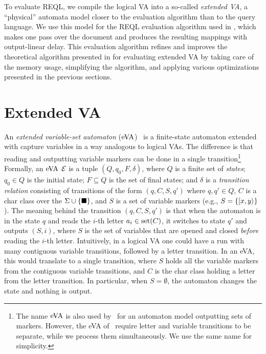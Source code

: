 
To evaluate REQL, we compile the logical VA into a so-called \emph{extended VA},
a ``physical'' automata model closer to the evaluation algorithm than to the
query language. We use this model for the REQL evaluation algorithm used in
\rematch, which makes one pass over the document and produces the resulting
mappings with output-linear delay. This evaluation algorithm refines and
improves the theoretical algorithm presented in \citet{FlorenzanoRUVV20} for
evaluating extended VA by taking care of the memory usage, simplifying the
algorithm, and applying various optimizations presented in the previous
sections.

\section{Extended VA}

An \emph{extended variable-set automaton} (\(\mathrm{eVA}\))~\citep{FaginKRV15} is a
finite-state automaton extended with capture variables in a way analogous to
logical VAs. The difference is that reading and outputting variable markers can
be done in a single transition\footnote{The name $\mathrm{eVA}$ is also used
by~\citet{FlorenzanoRUVV20} for an automaton model outputting sets of markers.
However, the eVA of~\citet{FlorenzanoRUVV20} require letter and variable
transitions to be separate, while we process them simultaneously. We use the
same name for simplicity.}
Formally, an $\mathrm{eVA}$ $\mathcal{E}$ is a tuple \((Q, q_0, F, \delta)\), where \(Q\) is a
finite set of \textit{states}; $q_0 \in Q$ is the initial state; $F\subseteq Q$
is the set of final states; and $\delta$ is a \textit{transition relation}
consisting of transitions of the form $(q, C, S, q')$ where $q, q' \in Q$, $C$
is a char class over the $\Sigma \cup \{\blacksquare\}$, and $S$ is a set of
variable markers (e.g., $S=\{[ x,y \rangle\}$). The meaning behind the
transition $(q, C, S, q')$ is that when the automaton is in the state $q$ and
reads the $i$-th letter $a_i \in \operatorname{set}(C)$, it switches to state $q'$ and
outputs $(S, i)$, where $S$ is the set of variables that are opened and closed
\emph{before} reading the $i$-th letter. Intuitively, in a logical VA one could
have a run with many contiguous variable transitions, followed by a letter
transition. In an eVA, this would translate to a single transition, where $S$
holds all the variable markers from the contiguous variable transitions, and $C$
is the char class holding  a letter from the letter transition. In particular,
when $S = \emptyset$, the automaton changes the state and nothing is output.


